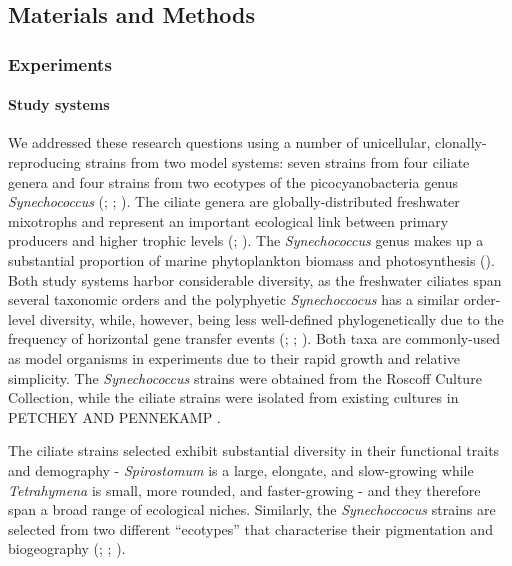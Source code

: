 \documentclass[
  letterpaper,
  DIV=11,
  numbers=noendperiod]{scrartcl}
\let\oldparagraph\paragraph
\renewcommand{\paragraph}[1]{\oldparagraph{#1}\mbox{}}
\begin{document}
\subsection{Materials and Methods}\label{sec-DAE_methods}

\subsubsection{Experiments}\label{experiments}

\paragraph{Study systems}\label{study-systems}

We addressed these research questions using a number of unicellular,
clonally-reproducing strains from two model systems: seven strains from
four ciliate genera and four strains from two ecotypes of the
picocyanobacteria genus \emph{Synechococcus}
(;
;
). The ciliate genera are
globally-distributed freshwater mixotrophs and represent an important
ecological link between primary producers and higher trophic levels
(;
). The
\emph{Synechococcus} genus makes up a substantial proportion of marine
phytoplankton biomass and photosynthesis
(). Both study systems
harbor considerable diversity, as the freshwater ciliates span several
taxonomic orders and the polyphyetic \emph{Synechoccocus} has a similar
order-level diversity, while, however, being less well-defined
phylogenetically due to the frequency of horizontal gene transfer events
(;
;
). Both taxa are
commonly-used as model organisms in experiments due to their rapid
growth and relative simplicity. The \emph{Synechococcus} strains were
obtained from the Roscoff Culture Collection, while the ciliate strains
were isolated from existing cultures in PETCHEY AND PENNEKAMP .

The ciliate strains selected exhibit substantial diversity in their
functional traits and demography - \emph{Spirostomum} is a large,
elongate, and slow-growing while \emph{Tetrahymena} is small, more
rounded, and faster-growing - and they therefore span a broad range of
ecological niches. Similarly, the \emph{Synechoccocus} strains are
selected from two different ``ecotypes'' that characterise their
pigmentation and biogeography (; ;
).
\end{document}
